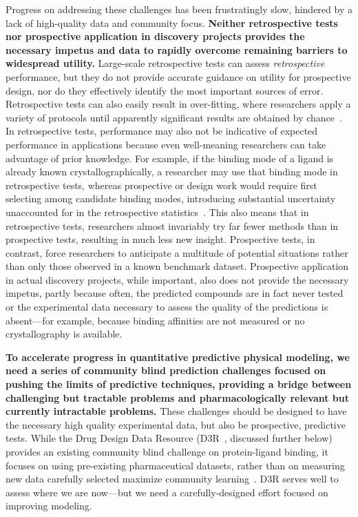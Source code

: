 \documentclass[11pt]{article}
\begin{document}
Progress on addressing these challenges has been frustratingly slow, hindered by a lack of high-quality data and community focus.
{\bf Neither retrospective tests nor prospective application in discovery projects provides the necessary impetus and data to rapidly overcome remaining barriers to widespread utility.}
Large-scale retrospective tests can assess \emph{retrospective} performance, but they do not provide accurate guidance on utility for prospective design, nor do they effectively identify the most important sources of error.
Retrospective tests can also easily result in over-fitting, where researchers apply a variety of protocols until apparently significant results are obtained by chance~\cite{Nuzzo:2015:Nature}.
In retrospective tests, performance may also not be indicative of expected performance in applications because even well-meaning researchers can take advantage of prior knowledge. 
For example, if the binding mode of a ligand is already known crystallographically, a researcher may use that binding mode in retrospective tests, whereas prospective or design work would require first selecting among candidate binding modes, introducing substantial uncertainty unaccounted for in the retrospective statistics~\cite{mobley_predicting_2007, boyce_predicting_2009, mobley_perspective_2012}.
This also means that in retrospective tests, researchers almost invariably try far fewer methods than in prospective tests, resulting in much less new insight.
Prospective tests, in contrast, force researchers to anticipate a multitude of potential situations rather than only those observed in a known benchmark dataset.
Prospective application in actual discovery projects, while important, also does not provide the necessary impetus, partly because often, the predicted compounds are in fact never tested~\cite{christ_binding_2016} or the experimental data necessary to assess the quality of the predictions is absent---for example, because binding affinities are not measured or no crystallography is available. 

{\bf To accelerate progress in quantitative predictive physical modeling, we need a series of community blind prediction challenges focused on pushing the limits of predictive techniques, providing a bridge between challenging but tractable problems and pharmacologically relevant but currently intractable problems.}
These challenges should be designed to have the necessary high quality experimental data, but also be prospective, predictive tests.
While the Drug Design Data Resource (D3R~\cite{gathiaka_d3r_2016}, discussed further below) provides an existing community blind challenge on protein-ligand binding, it focuses on using pre-existing pharmaceutical datasets, rather than on measuring new data carefully selected maximize community learning~\cite{gathiaka_d3r_2016}. 
D3R serves well to assess where we are now---but we need a carefully-designed effort focused on improving modeling.
\end{document}
